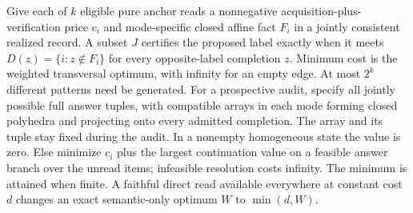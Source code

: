 \begin{theorem}\label{ext:m032}

Give each of \(k\) eligible pure anchor reads a nonnegative acquisition-plus-verification price \(c_i\) and mode-specific closed affine fact \(F_i\) in a jointly consistent realized record. A subset \(J\) certifies the proposed label exactly when it meets \(D(z)=\{i:z\notin F_i\}\) for every opposite-label completion \(z\). Minimum cost is the weighted transversal optimum, with infinity for an empty edge. At most \(2^k\) different patterns need be generated. For a prospective audit, specify all jointly possible full answer tuples, with compatible arrays in each mode forming closed polyhedra and projecting onto every admitted completion. The array and its tuple stay fixed during the audit. In a nonempty homogeneous state the value is zero. Else minimize \(c_i\) plus the largest continuation value on a feasible answer branch over the unread items; infeasible resolution costs infinity. The minimum is attained when finite. A faithful direct read available everywhere at constant cost \(d\) changes an exact semantic-only optimum \(W\) to \(\min(d,W)\).

\end{theorem}

